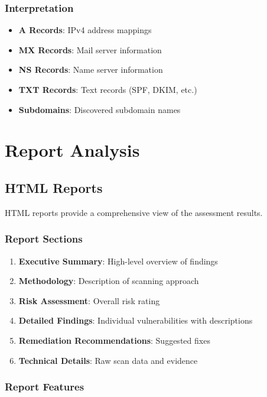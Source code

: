 \documentclass[12pt,a4paper]{report}
\begin{document}
\subsubsection{Interpretation}

\begin{itemize}
    \item \textbf{A Records}: IPv4 address mappings
    \item \textbf{MX Records}: Mail server information
    \item \textbf{NS Records}: Name server information
    \item \textbf{TXT Records}: Text records (SPF, DKIM, etc.)
    \item \textbf{Subdomains}: Discovered subdomain names
\end{itemize}

\section{Report Analysis}

\subsection{HTML Reports}

HTML reports provide a comprehensive view of the assessment results.

\subsubsection{Report Sections}

\begin{enumerate}
    \item \textbf{Executive Summary}: High-level overview of findings
    \item \textbf{Methodology}: Description of scanning approach
    \item \textbf{Risk Assessment}: Overall risk rating
    \item \textbf{Detailed Findings}: Individual vulnerabilities with descriptions
    \item \textbf{Remediation Recommendations}: Suggested fixes
    \item \textbf{Technical Details}: Raw scan data and evidence
\end{enumerate}

\subsubsection{Report Features}
\end{document}
